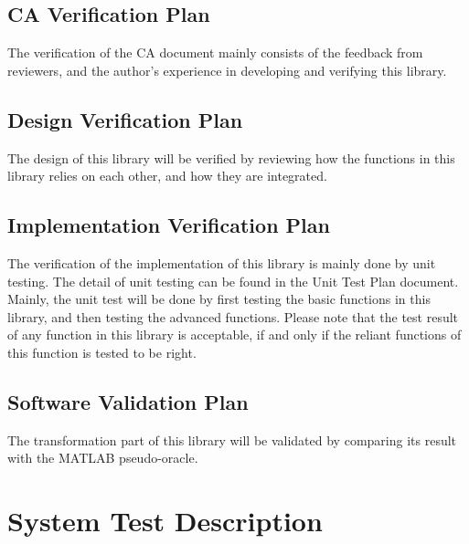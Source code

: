 \documentclass[12pt, titlepage]{article}
\begin{document}
\subsection{CA Verification Plan}

The verification of the CA document mainly consists of the feedback from reviewers, and the author's experience in developing and verifying this library. 


\subsection{Design Verification Plan}

The design of this library will be verified by reviewing how the functions in this library relies on each other, and how they are integrated.

\subsection{Implementation Verification Plan}



The verification of the implementation of this library is mainly done by unit testing. The detail of unit testing can be found in the Unit Test Plan document. Mainly, the unit test will be done by first testing the basic functions in this library, and then testing the advanced functions. Please note that the test result of any function in this library is acceptable, if and only if the reliant functions of this function is tested to be right.
  


\subsection{Software Validation Plan}

The transformation part of this library will be validated by comparing its result with the MATLAB pseudo-oracle.

\section{System Test Description}
	
\end{document}

